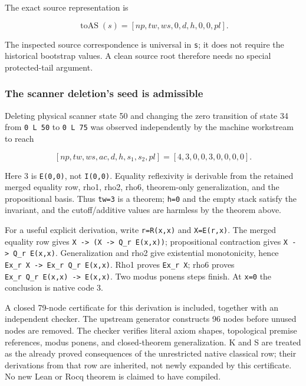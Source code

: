 \documentclass[
  11pt,
]{article}
\begin{document}
The exact source representation is

\[
\operatorname{toAS}(s)=[np,tw,ws,0,d,h,0,0,pl].
\]

The inspected source correspondence is universal in \texttt{s}; it does
not require the historical bootstrap values. A clean source root
therefore needs no special protected-tail argument.

\hypertarget{the-scanner-deletions-seed-is-admissible}{%
\subsubsection{The scanner deletion's seed is
admissible}\label{the-scanner-deletions-seed-is-admissible}}

Deleting physical scanner state 50 and changing the zero transition of
state 34 from \texttt{0\ L\ 50} to \texttt{0\ L\ 75} was observed
independently by the machine workstream to reach

\[
[np,tw,ws,ac,d,h,s_1,s_2,pl]=[4,3,0,0,3,0,0,0,0].
\]

Here 3 is \texttt{E(0,0)}, not \texttt{I(0,0)}. Equality reflexivity is
derivable from the retained merged equality row, rho1, rho2, rho6,
theorem-only generalization, and the propositional basis. Thus
\texttt{tw=3} is a theorem; \texttt{h=0} and the empty stack satisfy the
invariant, and the cutoff/additive values are harmless by the theorem
above.

For a useful explicit derivation, write \texttt{r=R(x,x)} and
\texttt{X=E(r,x)}. The merged equality row gives
\texttt{X\ -\textgreater{}\ (X\ -\textgreater{}\ Q\_r\ E(x,x))};
propositional contraction gives
\texttt{X\ -\textgreater{}\ Q\_r\ E(x,x)}. Generalization and rho2 give
existential monotonicity, hence
\texttt{Ex\_r\ X\ -\textgreater{}\ Ex\_r\ Q\_r\ E(x,x)}. Rho1 proves
\texttt{Ex\_r\ X}; rho6 proves
\texttt{Ex\_r\ Q\_r\ E(x,x)\ -\textgreater{}\ E(x,x)}. Two modus ponens
steps finish. At \texttt{x=0} the conclusion is native code 3.

A closed 79-node certificate for this derivation is included, together
with an independent checker. The upstream generator constructs 96 nodes
before unused nodes are removed. The checker verifies literal axiom
shapes, topological premise references, modus ponens, and closed-theorem
generalization. K and S are treated as the already proved consequences
of the unrestricted native classical row; their derivations from that
row are inherited, not newly expanded by this certificate. No new Lean
or Rocq theorem is claimed to have compiled.
\end{document}
